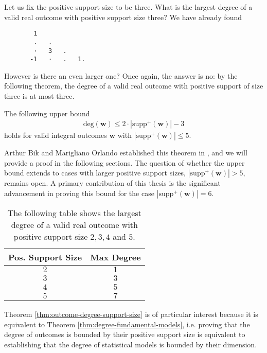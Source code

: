 \begin{example}
    Let us fix the positive support size to be three. What is the largest degree of a valid real outcome with positive support size three? We have already found
    \begin{verbatim}
        1  
        .   .     
        ·   3   .    
       -1   ·   .   1.   
    \end{verbatim} 
    However is there an even larger one? Once again, the answer is no: by the following theorem, the degree of a valid real outcome with positive support of size three is at most three.
 \end{example}

\begin{theorem}\label{thm:outcome-degree-support-size}
    The following upper bound
    \begin{align*}
        \mathrm{deg}(\mathbf w) \leq 2 \cdot |\mathrm{supp}^+(\mathbf w)| - 3
    \end{align*}
    holds for valid integral outcomes \( \mathbf w \) with \( |\mathrm{supp}^+(\mathbf w)| \leq 5 \). 
\end{theorem}

Arthur Bik and Marigliano Orlando established this theorem in \cite{bik2022classifying}, and we will provide a proof in the following sections. The question of whether the upper bound extends to cases with larger positive support sizes, \( |\mathrm{supp}^+(\mathbf w)| > 5 \), remains open. A primary contribution of this thesis is the significant advancement in proving this bound for the case \( |\mathrm{supp}^+(\mathbf w)| = 6 \).

\begin{table}[h!] 
    \centering
    \begin{tabular}{|c|c|}
        \hline
        \textbf{Pos. Support Size} & \textbf{Max Degree} \\
        \hline
        \(2\) & \(1\) \\
        \(3\) & \(3\) \\
        \(4\) & \(5\) \\
        \(5\) & \(7\) \\
        \hline
    \end{tabular}
    \caption{    The following table shows the largest degree of a valid real outcome with positive support size \( 2,3,4 \) and \( 5 \).}
    \label{tab:support_size_degree}
\end{table}

Theorem \ref{thm:outcome-degree-support-size} is of particular interest because it is equivalent to Theorem \ref{thm:degree-fundamental-models}, i.e. proving that the degree of outcomes is bounded by their positive support size is equivalent to establishing that the degree of statistical models is bounded by their dimension.

